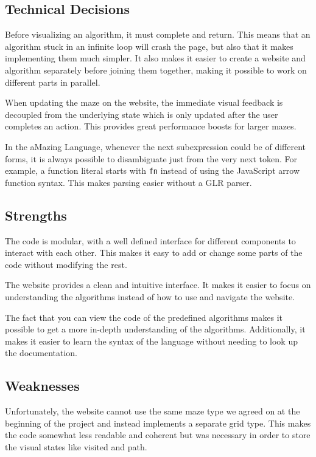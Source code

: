 \subsection{Technical Decisions}

Before visualizing an algorithm, it must complete and return. This means that an algorithm stuck in an infinite loop will crash the page, but also that it makes implementing them much simpler. It also makes it easier to create a website and algorithm separately before joining them together, making it possible to work on different parts in parallel.

When updating the maze on the website, the immediate visual feedback is decoupled from the underlying state which is only updated after the user completes an action. This provides great performance boosts for larger mazes.

In the aMazing Language, whenever the next subexpression could be of different forms, it is always possible to disambiguate just from the very next token. For example, a function literal starts with \verb|fn| instead of using the JavaScript arrow function syntax. This makes parsing easier without a GLR parser.

\subsection{Strengths}

The code is modular, with a well defined interface for different components to interact with each other. This makes it easy to add or change some parts of the code without modifying the rest.

The website provides a clean and intuitive interface. It makes it easier to focus on understanding the algorithms instead of how to use and navigate the website.

The fact that you can view the code of the predefined algorithms makes it possible to get a more in-depth understanding of the algorithms. Additionally, it makes it easier to learn the syntax of the language without needing to look up the documentation.

\subsection{Weaknesses}

Unfortunately, the website cannot use the same maze type we agreed on at the beginning of the project and instead implements a separate grid type. This makes the code somewhat less readable and coherent but was necessary in order to store the visual states like visited and path.

